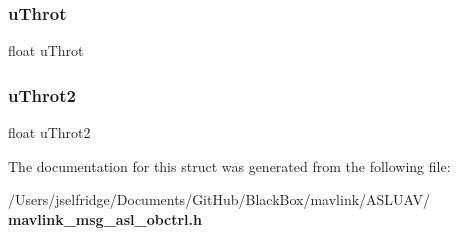 \mbox{\label{struct____mavlink__asl__obctrl__t_ab3d39050188b07643726cc4d7b7e3966}} 
\subsubsection{u\+Throt}
{\footnotesize\ttfamily float u\+Throt}

\mbox{\label{struct____mavlink__asl__obctrl__t_a43faa15b0498635a6c5c21b61d5dfffd}} 
\subsubsection{u\+Throt2}
{\footnotesize\ttfamily float u\+Throt2}



The documentation for this struct was generated from the following file\+:\begin{DoxyCompactItemize}
\item 
/\+Users/jselfridge/\+Documents/\+Git\+Hub/\+Black\+Box/mavlink/\+A\+S\+L\+U\+A\+V/\textbf{ mavlink\+\_\+msg\+\_\+asl\+\_\+obctrl.\+h}\end{DoxyCompactItemize}
